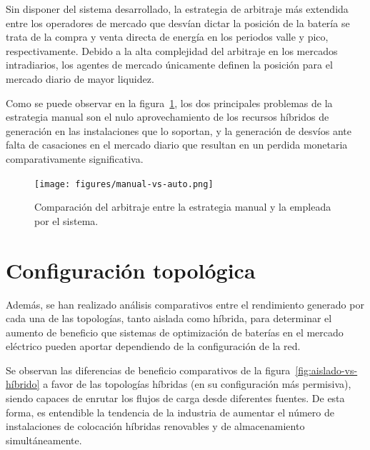 Sin disponer del sistema desarrollado, la estrategia de arbitraje más extendida entre los operadores de mercado que desvían dictar la posición de la batería se trata de la compra y venta directa de energía en los periodos valle y pico, respectivamente. Debido a la alta complejidad del arbitraje en los mercados intradiarios, los agentes de mercado únicamente definen la posición para el mercado diario de mayor liquidez.

Como se puede observar en la figura~\ref{fig:manual-vs-auto}, los dos principales problemas de la estrategia manual son el nulo aprovechamiento de los recursos híbridos de generación en las instalaciones que lo soportan, y la generación de desvíos ante falta de casaciones en el mercado diario que resultan en un perdida monetaria comparativamente significativa.

\begin{figure}
  \centering
  \texttt{[image: figures/manual-vs-auto.png]}
  \caption[Comparación del arbitraje entre la estrategia manual y la automática.]{Comparación del arbitraje entre la estrategia manual y la empleada por el sistema.}
  \label{fig:manual-vs-auto}
\end{figure}

\section{Configuración topológica}
\label{makereference7.3}


Además, se han realizado análisis comparativos entre el rendimiento generado por cada una de las topologías, tanto aislada como híbrida, para determinar el aumento de beneficio que sistemas de optimización de baterías en el mercado eléctrico pueden aportar dependiendo de la configuración de la red.

Se observan las diferencias de beneficio comparativos de la figura~\ref{fig:aislado-vs-híbrido} a favor de las topologías híbridas (en su configuración más permisiva), siendo capaces de enrutar los flujos de carga desde diferentes fuentes. De esta forma, es entendible la tendencia de la industria de aumentar el número de instalaciones de colocación híbridas renovables y de almacenamiento simultáneamente.

